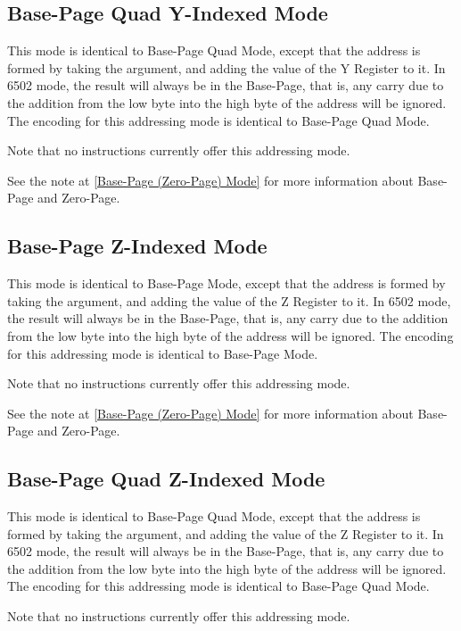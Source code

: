 \subsection{Base-Page Quad Y-Indexed Mode}

This mode is identical to Base-Page Quad Mode, except that the address is formed by taking the
argument, and adding the value of the Y Register to it.  In 6502 mode, the result will always
be in the Base-Page, that is, any carry due to the addition from the low byte into the high byte
of the address will be ignored.  The encoding for this addressing mode is identical to Base-Page Quad
Mode.

Note that no instructions currently offer this addressing mode.

See the note at \ref{Base-Page (Zero-Page) Mode} for more information about Base-Page and Zero-Page.

\subsection{Base-Page Z-Indexed Mode}

This mode is identical to Base-Page Mode, except that the address is formed by taking the
argument, and adding the value of the Z Register to it.  In 6502 mode, the result will always
be in the Base-Page, that is, any carry due to the addition from the low byte into the high byte
of the address will be ignored.  The encoding for this addressing mode is identical to Base-Page
Mode.

Note that no instructions currently offer this addressing mode.

See the note at \ref{Base-Page (Zero-Page) Mode} for more information about Base-Page and Zero-Page.

\subsection{Base-Page Quad Z-Indexed Mode}

This mode is identical to Base-Page Quad Mode, except that the address is formed by taking the
argument, and adding the value of the Z Register to it.  In 6502 mode, the result will always
be in the Base-Page, that is, any carry due to the addition from the low byte into the high byte
of the address will be ignored.  The encoding for this addressing mode is identical to Base-Page Quad
Mode.

Note that no instructions currently offer this addressing mode.

